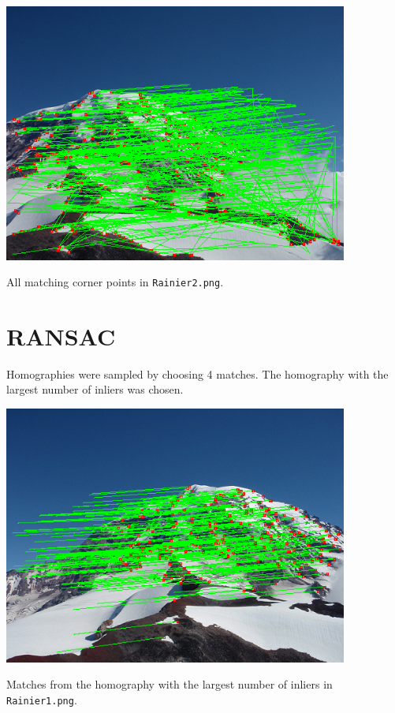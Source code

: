 \documentclass[letterpaper]{article}
\begin{document}
\begin{center}
  \includegraphics[width=0.85\textwidth]{2b.png}
  
  All matching corner points in \texttt{Rainier2.png}.
\end{center}

\section{RANSAC}

Homographies were sampled by choosing 4 matches. The homography with the largest
number of inliers was chosen.

\begin{center}
  \includegraphics[width=0.85\textwidth]{3a.png}
  
  Matches from the homography with the largest number of inliers in
  \texttt{Rainier1.png}.
\end{center}
\end{document}
